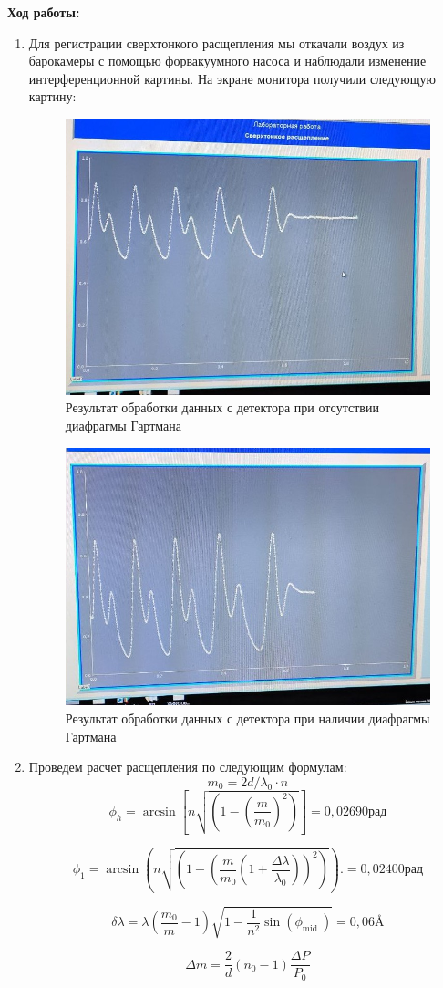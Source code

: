 \documentclass[a4paper, 12pt]{article}%
\begin{document}
	\textbf{Ход работы: }\\
	\begin{enumerate}
	\item Для регистрации сверхтонкого расщепления мы откачали воздух из барокамеры с помощью форвакуумного насоса и наблюдали изменение интерференционной картины. На экране монитора получили следующую картину:
	
	

	\begin{figure}[H]
	\centering
	\includegraphics[width=0.8\linewidth]{result.jpg}
	\caption{Результат обработки данных с детектора при отсутствии диафрагмы Гартмана}
	\end{figure}
	
 	\begin{figure}[H]
		\centering
		\includegraphics[width=0.8\linewidth]{result_1.jpg}
		\caption{Результат обработки данных с детектора при наличии диафрагмы Гартмана}
	\end{figure}
	
	\item Проведем расчет расщепления по следующим формулам: 
	$$ m_0 = 2d/\lambda_0 \cdot n $$
	$$ \phi_h=\arcsin \left[n \sqrt{\left(1-\left(\frac{m}{m_0}\right)^2\right)}\right] = 0,02690 \text{рад}$$
	
	$$ \phi_1=\arcsin \left(n\sqrt{\left(1-\left(\frac{m}{m_0}\left(1+\frac{\Delta \lambda}{\lambda_0}\right)\right)^2\right)} \right). = 0,02400 \text{рад}$$ 
	
	$$ \delta \lambda=\lambda\left(\frac{m_0}{m}-1\right) \sqrt{1-\frac{1}{n^2} \sin \left(\phi_{\text {mid }}\right)} = 0,06 \text{\AA} $$

 	$$\Delta m = \frac{2}{d}(n_0 - 1)\frac{\Delta P}{P_0}$$
	\end{enumerate}
	 	
\end{document}
